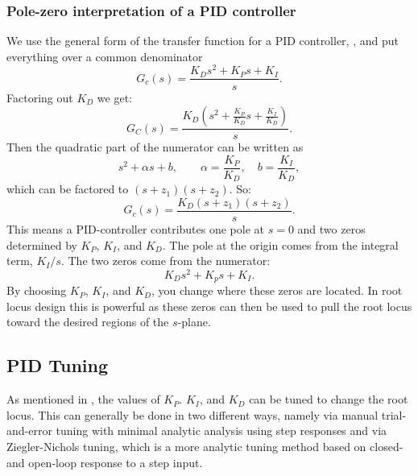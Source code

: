 \subsubsection{Pole-zero interpretation of a PID controller} \label{sec:pzPID}
We use the general form of the transfer function for a PID controller, , and put everything over a common denominator
\begin{equation*}
  G_c(s) = \frac{K_D s^2 + K_P s + K_I}{s}
.\end{equation*}
Factoring out $K_D$ we get:
\begin{equation*}
  G_C (s) = \frac{K_D \left( s^2 + \frac{K_P}{K_D}s + \frac{K_I}{K_D} \right)}{s}
.\end{equation*}
Then the quadratic part of the numerator can be written as
\begin{equation*}
  s^2 + \alpha s + b, \qquad  \alpha = \frac{K_P}{K_D}, \quad b = \frac{K_I}{K_D}
,\end{equation*}
which can be factored to $(s+z_1)(s+z_2)$.
So:
\begin{equation*}
  G_c(s) = \frac{K_D(s + z_1)(s+z_2)}{s}
.\end{equation*}
This means a PID-controller contributes one pole at $s = 0$ and two zeros determined by $K_P$, $K_I$, and $K_D$.
The pole at the origin comes from the integral term, $K_I / s$.
The two zeros come from the numerator:
\begin{equation*}
  K_D s^2 + K_p s + K_I
.\end{equation*}
By choosing $K_P$, $K_I$, and $K_D$, you change where these zeros are located.
In root locus design this is powerful as these zeros can then be used to pull the root locus toward the desired regions of the $s$-plane.

\subsection{PID Tuning}
As mentioned in , the values of $K_P$. $K_I$, and $K_D$ can be tuned to change the root locus. 
This can generally be done in two different ways, namely via manual trial-and-error tuning with minimal analytic analysis using step responses and via Ziegler-Nichols tuning, which is a more analytic tuning method based on closed- and open-loop response to a step input.

